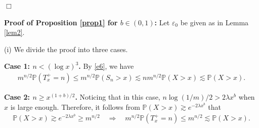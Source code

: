 \documentclass[11pt]{article}
\numberwithin{equation}{section}
\begin{document}
\hfill$\Box$

\noindent
\textbf{Proof of Proposition \ref{prop1} for $b\in (0,1)$:}
Let $\varepsilon_0$ be given as in Lemma \ref{lem2}. 

(i) We divide the proof into three cases.

\noindent
{\bf Case 1: $n<(\log x)^3$.}
 By \eqref{e6}, we have
  \begin{align}\label{e7}
		m^{n/2}\mathbb{P}(T_x^+=n)\leq m^{n/2} \mathbb{P}(S_n>x) \lesssim n m^{n/2} \mathbb{P}(X>x)\lesssim   \mathbb{P}(X>x).
\end{align}

\noindent
{\bf Case 2: $n\geq x^{(1+b)/2}$.}
Noticing that in this case, $n\log (1/m) /2 >2\lambda x^b$ when $x$ is large enough. Therefore, it follows from $\mathbb{P}(X>x)\gtrsim e^{-2\lambda x^b}$  that 
\begin{align}\label{e8}
	\mathbb{P}(X>x)\gtrsim e^{-2\lambda x^b} \geq m^{n/2} \quad  \Longrightarrow \quad m^{n/2}\mathbb{P}(T_x^+=n)\leq m^{n/2} \lesssim  	\mathbb{P}(X>x).
\end{align}
\end{document}
